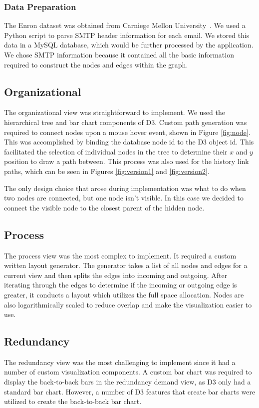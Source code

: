 \documentclass[journal]{vgtc}                %
\begin{document}
\subsubsection{Data Preparation}

The Enron dataset was obtained from Carniege Mellon University~\cite{cmuenron}.  We used a Python script to parse SMTP header information for each email.  We stored this data in a MySQL database, which would be further processed by the application. We chose SMTP information because it contained all the basic information required to construct the nodes and edges within the graph.

\subsection{Organizational}
The organizational view was straightforward to implement. We used the hierarchical tree and bar chart components of D3.  Custom path generation was required to connect nodes upon a mouse hover event, shown in Figure \ref{fig:node}.  This was accomplished by binding the database node id to the D3 object id.  This facilitated the selection of individual nodes in the tree to determine their $x$ and $y$ position to draw a path between.  This process was also used for the history link paths, which can be seen in Figures \ref{fig:version1} and \ref{fig:version2}.

The only design choice that arose during implementation was what to do when two nodes are connected, but one node isn't visible.  In this case we decided to connect the visible node to the closest parent of the hidden node.

\subsection{Process}
The process view was the most complex to implement.  It required a custom written layout generator.  The generator takes a list of all nodes and edges for a current view and then splits the edges into incoming and outgoing.  After iterating through the edges to determine if the incoming or outgoing edge is greater, it conducts a layout which utilizes the full space allocation.  Nodes are also logarithmically scaled to reduce overlap and make the visualization easier to use.

\subsection{Redundancy}
The redundancy view was the most challenging to implement since it had a number of custom visualization components.  A custom bar chart was required to display the back-to-back bars in the redundancy demand view, as D3 only had a standard bar chart.  However, a number of D3 features that create bar charts were utilized to create the back-to-back bar chart.
\end{document}
